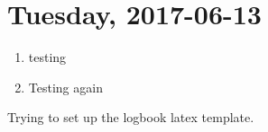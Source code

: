 \section{Tuesday, 2017-06-13}

\begin{enumerate}

\item testing
\item Testing again

\end{enumerate}


Trying to set up the logbook latex template.

\label{2017613:S}
